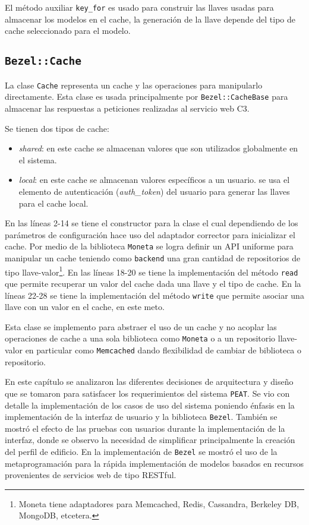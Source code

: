 El método auxiliar \texttt{key\_for} es usado para construir las llaves usadas para
almacenar los modelos en el cache, la generación de la llave depende del tipo de
cache seleccionado para el modelo.

\subsection{\texttt{Bezel::Cache}}

La clase \texttt{Cache} representa un cache y las operaciones para manipularlo
directamente. Esta clase es usada principalmente por \texttt{Bezel::CacheBase}
para almacenar las respuestas a peticiones realizadas al servicio web C3.

Se tienen dos tipos de cache:
\begin{itemize}
\item \textit{shared}: en este cache se almacenan valores que son utilizados
  globalmente en el sistema.
\item \textit{local}: en este cache se almacenan valores específicos a un usuario.
  se usa el elemento de autenticación (\textit{auth\_token}) del usuario para
  generar las llaves para el cache local.
\end{itemize}



En las líneas 2-14 se tiene el constructor para la clase el cual dependiendo de
los parámetros de configuración hace uso del adaptador corrector para inicializar
el cache. Por medio de la biblioteca \texttt{Moneta} se logra definir un API uniforme
para manipular un cache teniendo como \texttt{backend} una gran cantidad de
repositorios de tipo llave-valor\footnote{Moneta tiene adaptadores para Memcached,
  Redis, Cassandra, Berkeley DB, MongoDB, etcetera.}.
En las líneas 18-20 se tiene la implementación del método \texttt{read} que permite
recuperar un valor del cache dada una llave y el tipo de cache.
En la líneas 22-28 se tiene la implementación del método \texttt{write} que permite
asociar una llave con un valor en el cache, en este meto.

Esta clase se implemento para abstraer el uso de un cache y no acoplar las
operaciones de cache a una sola biblioteca como \texttt{Moneta} o a un
repositorio llave-valor en particular como \texttt{Memcached} dando flexibilidad de
cambiar de biblioteca o repositorio.

En este capítulo se analizaron las diferentes decisiones de arquitectura y diseño que
se tomaron para satisfacer los requerimientos del sistema \texttt{PEAT}.
Se vio con detalle la implementación de los casos de uso del sistema poniendo énfasis
en la implementación de la interfaz de usuario y la biblioteca \texttt{Bezel}.
También se mostró el efecto de las pruebas con usuarios durante la implementación de
la interfaz, donde se observo la necesidad de simplificar principalmente la creación
del perfil de edificio.
En la implementación de \texttt{Bezel} se mostró el uso de la metaprogramación
para la rápida implementación de modelos basados en recursos provenientes de
servicios web de tipo RESTful.
